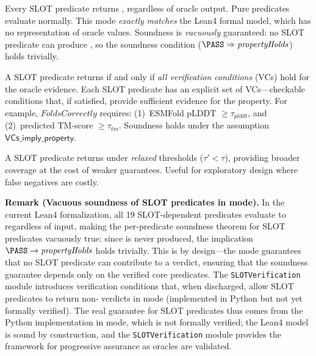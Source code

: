 \begin{description}[leftmargin=!,labelwidth=2.2cm,itemsep=3pt,topsep=2pt]
\item[\CONSERVATIVE:]
Every SLOT predicate returns \UNCERTAIN, regardless of oracle output.
Pure predicates evaluate normally.
This mode \emph{exactly matches} the Lean4 formal model, which has no
representation of oracle values.
Soundness is \emph{vacuously} guaranteed: no SLOT predicate can produce
\PASS, so the soundness condition
($\PASS \Rightarrow \mathit{propertyHolds}$) holds trivially.

\item[\VERIFIED:]
A SLOT predicate returns \PASS{} if and only if \emph{all verification
conditions} (VCs) hold for the oracle evidence.
Each SLOT predicate has an explicit set of VCs---checkable conditions
that, if satisfied, provide sufficient evidence for the property.
For example, $\mathit{FoldsCorrectly}$ requires:
(1)~ESMFold pLDDT $\ge \tau_{\mathit{plddt}}$, and
(2)~predicted TM-score $\ge \tau_{\mathit{tm}}$.
Soundness holds under the assumption
$\textsf{VCs\_imply\_property}$.

\item[\PERMISSIVE:]
A SLOT predicate returns \PASS{} under \emph{relaxed} thresholds
($\tau' < \tau$), providing broader coverage at the cost of weaker
guarantees.
Useful for exploratory design where false negatives are costly.
\end{description}

\noindent\textbf{Remark (Vacuous soundness of SLOT predicates in \CONSERVATIVE{} mode).}
In the current Lean4 formalization, all 19 SLOT-dependent predicates
evaluate to \UNCERTAIN{} regardless of input, making the per-predicate
soundness theorem for SLOT predicates vacuously true: since \PASS{} is
never produced, the implication $\PASS \to \mathit{propertyHolds}$ holds
trivially. This is by design---the \CONSERVATIVE{} mode guarantees that
no SLOT predicate can contribute to a \PASS{} verdict, ensuring that the
soundness guarantee depends only on the verified core predicates. The
\texttt{SLOTVerification} module introduces verification conditions that,
when discharged, allow SLOT predicates to return non-\UNCERTAIN{} verdicts
in \VERIFIED{} mode (implemented in Python but not yet formally verified).
The real guarantee for SLOT predicates thus comes from the Python
implementation in \VERIFIED{} mode, which is not formally verified; the
Lean4 model is sound by construction, and the \texttt{SLOTVerification}
module provides the framework for progressive assurance as oracles are
validated.

